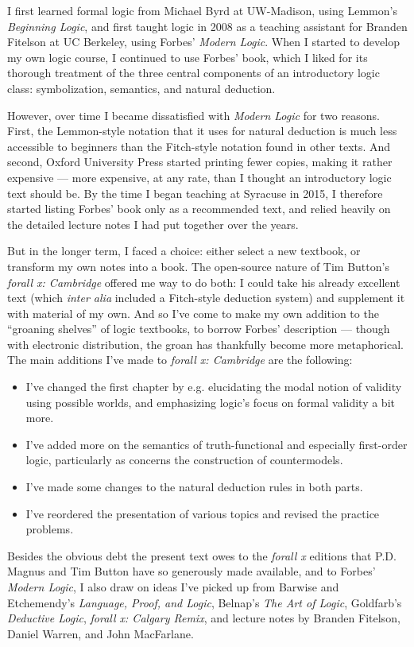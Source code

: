 I first learned formal logic from Michael Byrd at UW-Madison, using Lemmon's  \emph{Beginning Logic}, and first taught logic in 2008 as a teaching assistant for Branden Fitelson at UC Berkeley, using Forbes' \emph{Modern Logic}.  When I started to develop my own logic course, I continued to use Forbes' book, which I liked for its thorough treatment of the three central components of an introductory logic class: symbolization, semantics, and natural deduction.  

However, over time I became dissatisfied with \emph{Modern Logic} for two reasons.  First, the Lemmon-style notation that it uses for natural deduction is much less accessible to beginners than the Fitch-style notation found in other texts.  And second, Oxford University Press started printing fewer copies, making it rather expensive --- more expensive, at any rate, than I thought an introductory logic text should be.  By the time I began teaching at Syracuse in 2015, I therefore started listing Forbes' book only as a recommended text, and relied heavily on the detailed lecture notes I had put together over the years.

But in the longer term, I faced a choice: either select a new textbook, or transform my own notes into a book.  The open-source nature of Tim Button's \emph{forall x: Cambridge} offered me way to do both: I could take his already excellent text (which \emph{inter alia} included a Fitch-style deduction system) and supplement it with material of my own.  And so I've come to make my own addition to the ``groaning shelves'' of logic textbooks, to borrow Forbes' description --- though with electronic distribution, the groan has thankfully become more metaphorical. The main additions I've made to \emph{forall x: Cambridge} are the following:
\begin{itemize}
\item I've changed the first chapter by e.g. elucidating the modal notion of validity using possible worlds, and emphasizing logic's focus on formal validity a bit more.
\item I've added more on the semantics of truth-functional and especially first-order logic, particularly as concerns the construction of countermodels.  
\item I've made some changes to the natural deduction rules in both parts.
\item I've reordered the presentation of various topics and revised the practice problems.
\end{itemize}
Besides the obvious debt the present text owes to the \emph{forall x} editions that P.D. Magnus and Tim Button have so generously made available,  and to Forbes' \emph{Modern Logic}, I also draw on ideas I've picked up from Barwise and Etchemendy's \emph{Language, Proof, and Logic}, Belnap's \emph{The Art of Logic}, Goldfarb's \emph{Deductive Logic}, \emph{forall x: Calgary Remix}, and lecture notes by Branden Fitelson,  Daniel Warren, and John MacFarlane.


